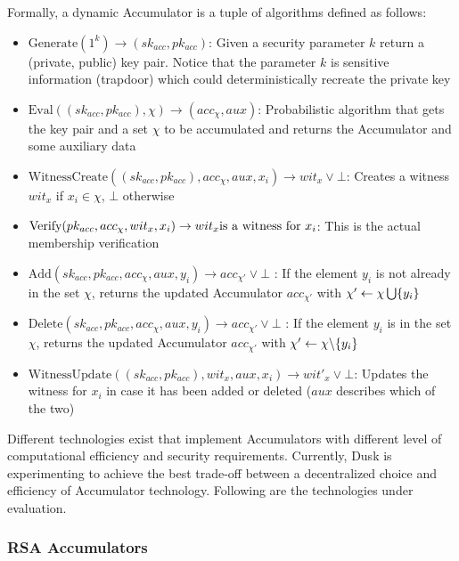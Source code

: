 Formally, a dynamic Accumulator is a tuple of algorithms defined as follows:

\begin{itemize}
\item  $\textrm{Generate}(1^k)\rightarrow (sk_{acc}, pk_{acc})$: Given a security parameter $k$ return a (private, public) key pair. Notice that the parameter $k$ is sensitive information (trapdoor) which could deterministically recreate the private key  
\item  $\textrm{Eval}((sk_{acc}, pk_{acc}), \chi) \rightarrow (acc_\chi, aux)$: Probabilistic algorithm that gets the key pair and a set $\chi$ to be accumulated and returns the Accumulator and some auxiliary data
\item  $\textrm{WitnessCreate}((sk_{acc}, pk_{acc}), acc_\chi, aux, x_i)\rightarrow wit_x \lor \bot$: Creates a witness $wit_x$ if $x_i \in \chi$, $\bot$ otherwise
\item  $\textrm{Verify}(pk_{acc}, acc_\chi, wit_x, x_i)\rightarrow wit_x\space \textrm{is a witness for }x_i$: This is the actual membership verification
\item  $\textrm{Add}(sk_{acc}, pk_{acc}, acc_\chi, aux, y_i)\rightarrow acc_{\chi'} \lor \bot$ : If the element $y_i$ is not already in the set $\chi$, returns the updated Accumulator $acc_{\chi'}$ with $\chi' \leftarrow \chi \space \bigcup \space \{y_i\}$ 
\item  $\textrm{Delete}(sk_{acc}, pk_{acc}, acc_\chi, aux, y_i)\rightarrow acc_{\chi'} \lor \bot$ : If the element $y_i$ is in the set $\chi$, returns the updated Accumulator $acc_{\chi'}$ with $\chi' \leftarrow \chi \space \backslash \space \{y_i\}$
\item  $\textrm{WitnessUpdate}((sk_{acc}, pk_{acc}), wit_x, aux, x_i)\rightarrow wit'_x \lor \bot$: Updates the witness for $x_i$ in case it has been added or deleted ($aux$ describes which of the two)
\end{itemize}

Different technologies exist that implement Accumulators with different level of computational efficiency and security requirements. Currently, \textrm{Dusk} is experimenting to achieve the best trade-off between a decentralized choice and efficiency of Accumulator technology. Following are the technologies under evaluation.

\subsubsection{RSA Accumulators}

